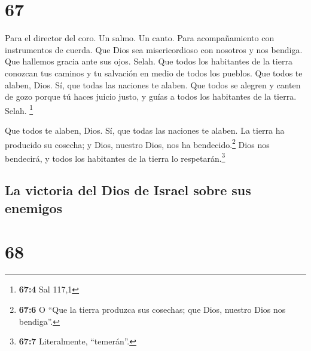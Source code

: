 \hypertarget{section-66}{%
\section{67}\label{section-66}}

Para el director del coro. Un salmo. Un canto. Para acompañamiento con
instrumentos de cuerda.  Que Dios sea misericordioso con
nosotros y nos bendiga. Que hallemos gracia ante sus ojos. Selah.
 Que todos los habitantes de la tierra conozcan tus
caminos y tu salvación en medio de todos los pueblos.  Que
todos te alaben, Dios. Sí, que todas las naciones te alaben.
 Que todos se alegren y canten de gozo porque tú haces
juicio justo, y guías a todos los habitantes de la tierra. Selah.
\footnote{\textbf{67:4} Sal 117,1}

 Que todos te alaben, Dios. Sí, que todas las naciones te
alaben.  La tierra ha producido su cosecha; y Dios,
nuestro Dios, nos ha bendecido.\footnote{\textbf{67:6} O ``Que la tierra
  produzca sus cosechas; que Dios, nuestro Dios nos bendiga''.}
 Dios nos bendecirá, y todos los habitantes de la tierra
lo respetarán.\footnote{\textbf{67:7} Literalmente, ``temerán''.}

\hypertarget{la-victoria-del-dios-de-israel-sobre-sus-enemigos}{%
\subsection{La victoria del Dios de Israel sobre sus
enemigos}\label{la-victoria-del-dios-de-israel-sobre-sus-enemigos}}

\hypertarget{section-67}{%
\section{68}\label{section-67}}


